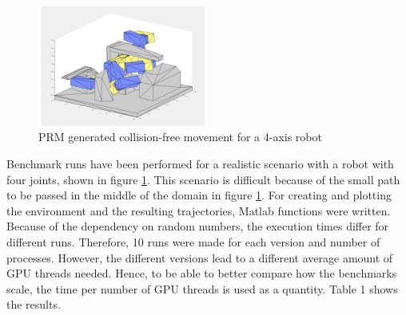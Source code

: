 \documentclass[twocolumn]{svjour3}
\begin{document}
\begin{figure}%
	\centering
	\includegraphics[width=0.5\textwidth]{robotsolution2_5.pdf}
	\caption{PRM generated collision-free movement for a 4-axis robot}\label{robotpic}
\end{figure}

Benchmark runs have been performed for a realistic scenario with a robot with four joints, shown in figure \ref{robotpic}.
This scenario is difficult because of the small path to be passed in the middle of the domain in figure \ref{robotpic}.
For creating and plotting the environment and the resulting trajectories, Matlab functions were written.
Because of the dependency on random numbers, the execution times differ for different runs.
Therefore, 10 runs were made for each version and number of processes.
However, the different versions lead to a different average amount of GPU threads needed.
Hence, to be able to better compare how the benchmarks scale, the time per number of GPU threads is used as a quantity.
Table 1 shows the results.
\end{document}
